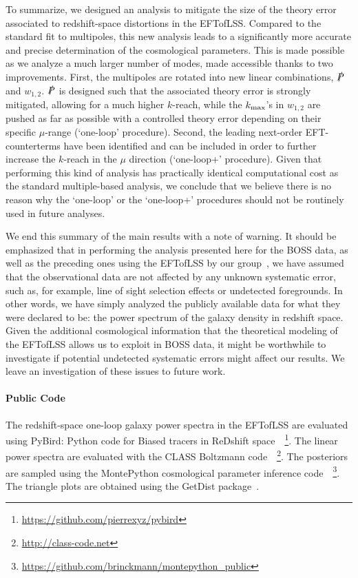 \documentclass[12pt,a4paper]{article}
\def\PA{\slashed{P}}
\renewcommand{\(}{\left(}
\renewcommand{\)}{\right)}
\begin{document}
{To summarize, we designed an analysis to mitigate the size of the theory error associated to redshift-space distortions in the EFTofLSS.  
Compared to the standard fit to multipoles, this new analysis leads to a significantly more accurate and precise determination of the cosmological parameters. 
This is made possible as we analyze a much larger number of modes, made accessible thanks to two improvements. 
First, the multipoles are rotated into new linear combinations, $\PA$ and $w_{1,2}$. 
$\PA$ is designed such that the associated theory error is strongly mitigated, allowing for a much higher $k$-reach,
while the $k_{\rm max}$'s in $w_{1,2}$ are pushed as far as possible with a controlled theory error depending on their specific $\mu$-range  (`one-loop' procedure). 
Second, the leading  next-order EFT-counterterms have been identified and can be included in order to further increase the $k$-reach in the $\mu$ direction (`one-loop+' procedure). 
} 
Given that performing this kind of analysis has practically identical computational cost as the standard multiple-based analysis, we conclude that we believe there is no reason why the {`one-loop'} or the `one-loop+' procedures should not be routinely used in future analyses.



We end this summary of the main results with a note of warning. It should be emphasized that in performing the analysis presented here for the BOSS data, as well as the preceding ones using the EFTofLSS by our group~\cite{DAmico:2019fhj,Colas:2019ret,DAmico:2020kxu,DAmico:2020tty,DAmico:2020ods}, we have assumed that the observational data are not affected by any unknown systematic error, such as, for example, line of sight selection effects or undetected foregrounds. In other words, we have simply analyzed the publicly available data for what they were declared to be: the power spectrum of the galaxy density in redshift space. Given the additional cosmological information that the theoretical modeling of the EFTofLSS allows us to exploit in BOSS data, it might be worthwhile to investigate if potential undetected systematic errors might affect our results. We leave an investigation of these issues to future work.


\paragraph{Public Code} The redshift-space one-loop galaxy power spectra in the EFTofLSS are evaluated using PyBird: Python code for Biased tracers in ReDshift space~\cite{DAmico:2020kxu}~\footnote{\href{https://github.com/pierrexyz/pybird}{https://github.com/pierrexyz/pybird}}.
The linear power spectra are evaluated with the CLASS Boltzmann code~\cite{Blas_2011}~\footnote{\href{http://class-code.net}{http://class-code.net}}.
The posteriors are sampled using the MontePython cosmological parameter inference code~\cite{Brinckmann:2018cvx, Audren:2012wb}~\footnote{\href{https://github.com/brinckmann/montepython\_public}{https://github.com/brinckmann/montepython\_public}}.
The triangle plots are obtained using the GetDist package~\cite{Lewis:2019xzd}.
\end{document}

